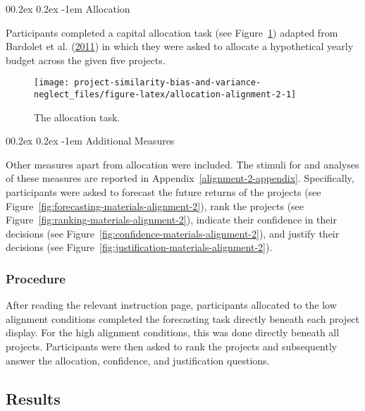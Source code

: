 \documentclass[
  english,
  man, donotrepeattitle,floatsintext]{apa7}
\makeatletter
\let\oldparagraph\paragraph
\renewcommand{\paragraph}[1]{\oldparagraph{#1}\mbox{}}
\renewcommand{\paragraph}{\@startsection{paragraph}{4}{\parindent}%
  {0\baselineskip \@plus 0.2ex \@minus 0.2ex}%
  {-1em}%
  {\normalfont\normalsize\bfseries\itshape\typesectitle}}
\theoremstyle{definition}
\theoremstyle{definition}
\theoremstyle{definition}
\theoremstyle{definition}
\theoremstyle{remark}
\makeatother
\begin{document}
\hypertarget{allocation}{%
\paragraph{Allocation}\label{allocation}}

Participants completed a capital allocation task (see
Figure~\ref{fig:allocation-alignment-2}) adapted from Bardolet et al. (\protect\hyperlink{ref-bardolet2011}{2011}) in which
they were asked to allocate a hypothetical yearly budget across the given five
projects.



\begin{figure}
\texttt{[image: project-similarity-bias-and-variance-neglect\_files/figure-latex/allocation-alignment-2-1]} \caption{The allocation task.}\label{fig:allocation-alignment-2}
\end{figure}

\hypertarget{additional-measures}{%
\paragraph{Additional Measures}\label{additional-measures}}

Other measures apart from allocation were included. The stimuli for and analyses
of these measures are reported in
Appendix~\ref{alignment-2-appendix}. Specifically,
participants were asked to forecast the future returns of the projects (see
Figure~\ref{fig:forecasting-materials-alignment-2}), rank the projects (see
Figure~\ref{fig:ranking-materials-alignment-2}), indicate their confidence in
their decisions (see Figure~\ref{fig:confidence-materials-alignment-2}), and
justify their decisions (see
Figure~\ref{fig:justification-materials-alignment-2}).

\hypertarget{procedure}{%
\subsubsection{Procedure}\label{procedure}}

After reading the relevant instruction page, participants allocated to the low
alignment conditions completed the forecasting task directly beneath each
project display. For the high alignment conditions, this was done directly
beneath all projects. Participants were then asked to rank the projects and
subsequently answer the allocation, confidence, and justification questions.

\hypertarget{results}{%
\subsection{Results}\label{results}}
\end{document}
